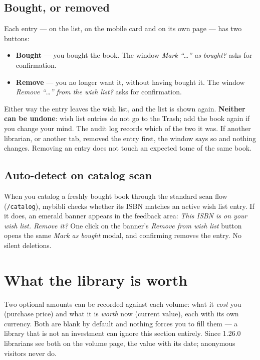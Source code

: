 \subsection{Bought, or removed}

Each entry --- on the list, on the mobile card and on its own page ---
has two buttons:

\begin{itemize}
  \item \textbf{Bought} --- you bought the book. The window \emph{Mark
        ``\dots'' as bought?} asks for confirmation.
  \item \textbf{Remove} --- you no longer want it, without having
        bought it. The window \emph{Remove ``\dots'' from the wish
        list?} asks for confirmation.
\end{itemize}

Either way the entry leaves the wish list, and the list is shown again.
\textbf{Neither can be undone}: wish list entries do not go to the
Trash; add the book again if you change your mind. The audit log
records which of the two it was. If another librarian, or another tab,
removed the entry first, the window says so and nothing changes.
Removing an entry does not touch an expected tome of the same book.

\subsection{Auto-detect on catalog scan}

When you catalog a freshly bought book through the standard scan
flow (\texttt{/catalog}), mybibli checks whether its ISBN matches
an active wish list entry. If it does, an emerald banner appears
in the feedback area: \emph{This ISBN is on your wish list. Remove
it?} One click on the banner's \emph{Remove from wish list} button
opens the same \emph{Mark as bought} modal, and confirming removes
the entry. No silent deletions.

\section{What the library is worth}\label{sec:valuation}

Two optional amounts can be recorded against each volume: what it
\emph{cost} you (purchase price) and what it is \emph{worth} now
(current value), each with its own currency. Both are blank by default
and nothing forces you to fill them --- a library that is not an
investment can ignore this section entirely. Since 1.26.0 librarians
see both on the volume page, the value with its date; anonymous
visitors never do.

